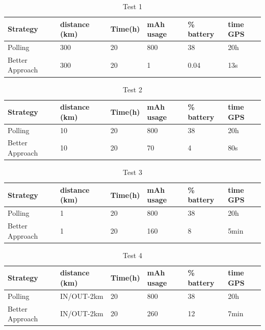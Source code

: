 \documentclass[conference]{IEEEtran}
\begin{document}
\begin{table}[h]
  \centering
    \begin{tabular}{|P{1.4cm}|P{0.8cm}|P{0.8cm}|P{0.8cm}|P{0.8cm}|P{0.8cm}|}
    \hline
    Strategy & distance (km) & Time(h) & mAh usage & \% battery & time GPS \\ \hline
    Polling & 300 & 20 & 800 & 38 & 20h   \\ \hline
    Better Approach & 300 & 20 & 1 & 0.04 & 13s   \\ \hline
  \end{tabular}
  \newline\newline
  \caption{Test 1}
\end{table}

\begin{table}[h]
  \centering
    \begin{tabular}{|P{1.4cm}|P{0.8cm}|P{0.8cm}|P{0.8cm}|P{0.8cm}|P{0.8cm}|}
    \hline
    Strategy & distance (km) & Time(h) & mAh usage & \% battery & time GPS \\ \hline
    Polling & 10 & 20 & 800 & 38 & 20h   \\ \hline
    Better Approach & 10 & 20 & 70 & 4 & 80s   \\ \hline
  \end{tabular}
  \newline\newline
  \caption{Test 2}
\end{table}

\begin{table}[h]
  \centering
    \begin{tabular}{|P{1.4cm}|P{0.8cm}|P{0.8cm}|P{0.8cm}|P{0.8cm}|P{0.8cm}|}
    \hline
    Strategy & distance (km) & Time(h) & mAh usage & \% battery & time GPS \\ \hline
    Polling & 1 & 20 & 800 & 38 & 20h   \\ \hline
    Better Approach & 1 & 20 & 160 & 8 & 5min   \\ \hline
  \end{tabular}
  \newline\newline
  \caption{Test 3}
\end{table}

\begin{table}[h]
  \centering
    \begin{tabular}{|P{1.4cm}|P{0.8cm}|P{0.8cm}|P{0.8cm}|P{0.8cm}|P{0.8cm}|}
    \hline
    Strategy & distance (km) & Time(h) & mAh usage & \% battery & time GPS \\ \hline
    Polling & IN/OUT-2km & 20 & 800 & 38 & 20h   \\ \hline
    Better Approach & IN/OUT-2km & 20 & 260 & 12 & 7min   \\ \hline
  \end{tabular}
  \newline\newline
  \caption{Test 4}
\end{table}
\end{document}
